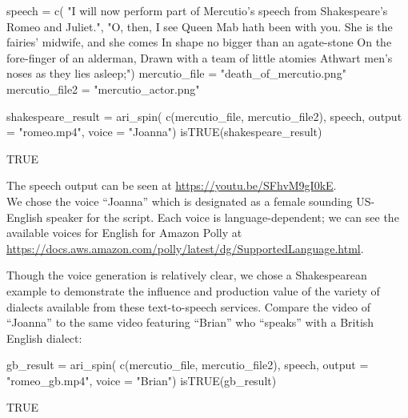\begin{Schunk}
\begin{Sinput}
speech =  c(
  "I will now perform part of Mercutio's speech from Shakespeare's Romeo and Juliet.", 
  "O, then, I see Queen Mab hath been with you.
   She is the fairies' midwife, and she comes
   In shape no bigger than an agate-stone
   On the fore-finger of an alderman,
   Drawn with a team of little atomies
   Athwart men's noses as they lies asleep;")
mercutio_file = "death_of_mercutio.png"
mercutio_file2 = "mercutio_actor.png"
\end{Sinput}
\end{Schunk}

\begin{Schunk}
\begin{Sinput}
shakespeare_result = ari_spin(
  c(mercutio_file, mercutio_file2),
  speech, output = "romeo.mp4", voice = "Joanna")
isTRUE(shakespeare_result)
\end{Sinput}
\end{Schunk}

\begin{Schunk}
\begin{Soutput}
[1] TRUE
\end{Soutput}
\end{Schunk}

The speech output can be seen at \url{https://youtu.be/SFhvM9gI0kE}.\\
We chose the voice ``Joanna'' which is designated as a female sounding
US-English speaker for the script. Each voice is language-dependent; we
can see the available voices for English for Amazon Polly at
\url{https://docs.aws.amazon.com/polly/latest/dg/SupportedLanguage.html}.

Though the voice generation is relatively clear, we chose a
Shakespearean example to demonstrate the influence and production value
of the variety of dialects available from these text-to-speech services.
Compare the video of ``Joanna'' to the same video featuring ``Brian''
who ``speaks'' with a British English dialect:

\begin{Schunk}
\begin{Sinput}
gb_result = ari_spin(
  c(mercutio_file, mercutio_file2),
  speech, output = "romeo_gb.mp4", voice = "Brian")
isTRUE(gb_result)
\end{Sinput}
\end{Schunk}

\begin{Schunk}
\begin{Soutput}
[1] TRUE
\end{Soutput}
\end{Schunk}


